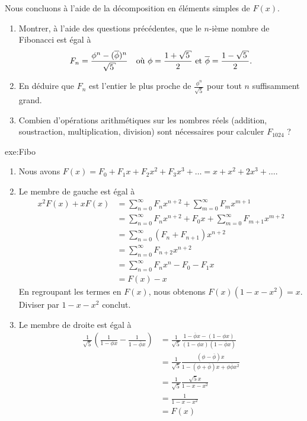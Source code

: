 {\begin{enumerate}[resume]
	\end{enumerate}
	Nous concluons à l'aide de la décomposition en éléments simples de $F(x)$.
	\begin{enumerate}[resume]
		\item
		Montrer, à l'aide des questions précédentes, que le $n$-ième nombre de Fibonacci est égal à
		\begin{align*}
			F_n = \frac{\phi^{n} - (\overline{\phi})^{n}}{\sqrt5} && \text{où } \phi = \frac{1+\sqrt5}2 \et \overline{\phi} = \frac{1-\sqrt5}2.
		\end{align*}
		\item
		En déduire que $F_n$ est l'entier le plus proche de $\frac{\phi^n}{\sqrt5}$ pour tout $n$ suffisamment grand.
		\item
		Combien d'opérations arithmétiques sur les nombres réels (addition, soustraction, multiplication, division) sont nécessaires pour calculer $F_{1024}$ ?
	\end{enumerate}
}{exe:Fibo}{
	\begin{enumerate}
		\item
		Nous avons $F(x) = F_0 + F_1x + F_2x^2 + F_3x^3 + \dots = x + x^2 + 2x^3 + \dots$.
	
		\item
		Le membre de gauche est égal à
		\begin{align*}
			x^2 F(x) + x F(x) &= \sum_{n=0}^{\infty} F_n x^{n+2} + \sum_{m=0}^{\infty} F_mx^{m+1} \\
				&= \sum_{n=0}^{\infty} F_n x^{n+2} + F_0 x + \sum_{m=0}^{\infty} F_{m+1} x^{m+2} \\
				&= \sum_{n=0}^{\infty} (F_n + F_{n+1}) x^{n+2} \\
				&= \sum_{n=0}^{\infty} F_{n+2}x^{n+2} \\
				&= \sum_{n=0}^{\infty} F_n x^n - F_0 - F_1x \\
				&= F(x) - x
		\end{align*}
		En regroupant les termes en $F(x)$, nous obtenons $F(x) (1 - x - x^2) = x$.
		Diviser par $1-x-x^2$ conclut.
		
		\item
		Le membre de droite est égal à
		\begin{align*}
			 \frac{1}{\sqrt5} \left( \frac1{1-\phi x} - \frac1{1-\overline{\phi}x} \right) &= 
			 \frac{1}{\sqrt5} \frac{1-\overline{\phi}x - (1-\phi x)}{(1-\phi x)(1-\overline{\phi}x)}  \\
			 &= \frac{1}{\sqrt5} \frac{(\phi-\overline{\phi})x}{1 - (\phi + \overline{\phi})x + \phi\overline{\phi} x^2}  \\
			 &= \frac{1}{\sqrt5} \frac{\sqrt5x}{1 -x - x^2}  \\
			 &= \frac{1}{1-x-x^2} \\
			 &= F(x)
		\end{align*}
		

\end{enumerate}}
